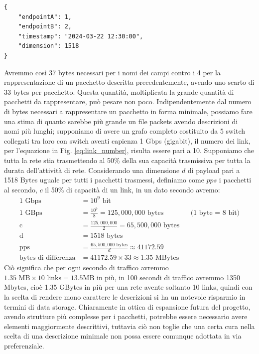 \documentclass[binding=0.6cm]{sapthesis}
\begin{document}
{\scriptsize %
\begin{lstlisting}[caption={Rappresentazione di un pacchetto con descrizione completa}, label={codice:long_description_packet}]
{
    "endpointA": 1,
    "endpointB": 2,
    "timestamp": "2024-03-22 12:30:00",
    "dimension": 1518
}
\end{lstlisting}
}

Avremmo così 37 bytes necessari per i nomi dei campi contro i 4 per la rappresentazione di un pacchetto descritta precedentemente, avendo uno scarto di
33 bytes per pacchetto. Questa quantità, moltiplicata la grande quantità di pacchetti da rappresentare, può pesare non poco.
Indipendentemente dal numero di bytes necessari a rappresentare un pacchetto in forma minimale, possiamo fare una stima di quanto sarebbe più grande
un file packets avendo descrizioni di nomi più lunghi; supponiamo di avere un grafo completo costituito da 5 switch collegati tra loro con switch
aventi capienza 1 Gbps (gigabit), il numero dei link, per l'equazione in Fig. \ref{eq:link_number}, risulta essere pari a 10. Supponiamo che tutta la rete
stia trasmettendo al 50\% della sua capacità trasmissiva per tutta la durata dell'attività di rete. Considerando una dimensione \(d\) di payload pari 
a 1518 Bytes uguale per tutti i pacchetti trasmessi,
definiamo come \(pps\) i pacchetti al secondo, \(c\) il 50\% di capacità di un link, in un dato secondo avremo:
\begin{align*}
    \text{1 Gbps} &= 10^9 \text{ bit}\\
    \text{1 GBps} &= \frac{10^9}{8} = 125,000,000 \text{ bytes} && \text{(1 byte = 8 bit)} \\
    \text{c} &= \frac{125,000,000}{2} = 65,500,000 \text{ bytes}\\
    \text{d} &= 1518 \text{ bytes} \\
    \text{pps} &= \frac{65,500,000 \text{ bytes}}{d}\approx 41172.59\\
    \text{bytes di differenza} &= 41172.59 \times 33 \approx 1.35 \text{ MBytes}
\end{align*}
Ciò significa che per ogni secondo di traffico avremmo \(1.35 \text{ MB} \times 10\text{ links} = 13.5 \text{MB}\) in più, 
 in 100 secondi di traffico avremmo 1350 Mbytes, cioè 1.35 GBytes in più per una rete avente soltanto 10 links, quindi con la scelta di rendere
  mono carattere le descrizioni
 si ha un notevole risparmio in termini di data storage. Chiaramente in ottica di espansione futura del progetto, avendo strutture più complesse
 per i pacchetti, potrebbe essere necessario avere elementi maggiormente descrittivi, tuttavia ciò non toglie che una certa cura nella scelta di una 
 descrizione minimale non possa essere comunque adottata in via preferenziale.
\end{document}
